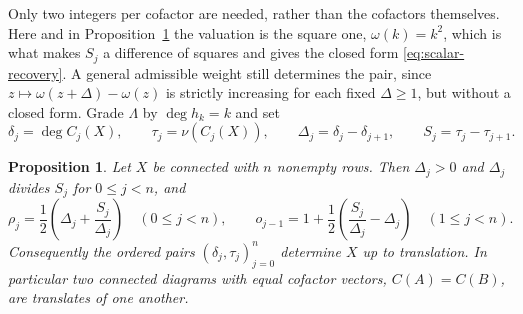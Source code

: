 \documentclass[11pt,a4paper]{amsart}
\numberwithin{equation}{section}
\theoremstyle{plain}
\newtheorem{proposition}[theorem]{Proposition}
\theoremstyle{definition}
\newcommand{\Lam}{\Lambda}
\newcommand{\wt}{\nu}
\begin{document}
Only two integers per cofactor are needed, rather than the cofactors themselves.  Here and in Proposition~\ref{prop:stable-cofactor} the valuation is the square one, \(\omega(k)=k^2\), which is what makes \(S_j\) a difference of squares and gives the closed form \eqref{eq:scalar-recovery}.  A general admissible weight still determines the pair, since \(z\mapsto\omega(z+\Delta)-\omega(z)\) is strictly increasing for each fixed \(\Delta\ge1\), but without a closed form.  Grade \(\Lam\) by \(\deg h_k=k\) and set
\begin{equation}\label{eq:scalar-data}
\delta_j=\deg C_j(X),
\qquad
\tau_j=\wt(C_j(X)),
\qquad
\Delta_j=\delta_j-\delta_{j+1},
\qquad
S_j=\tau_j-\tau_{j+1}.
\end{equation}

\begin{proposition}\label{prop:stable-cofactor}
Let \(X\) be connected with \(n\) nonempty rows.  Then \(\Delta_j>0\) and \(\Delta_j\) divides \(S_j\) for \(0\le j<n\), and
\begin{equation}\label{eq:scalar-recovery}
\rho_j
=
\frac12\left(\Delta_j+\frac{S_j}{\Delta_j}\right)
\quad(0\le j<n),
\qquad
o_{j-1}
=
1+\frac12\left(\frac{S_j}{\Delta_j}-\Delta_j\right)
\quad(1\le j<n).
\end{equation}
Consequently the ordered pairs \((\delta_j,\tau_j)_{j=0}^{n}\) determine \(X\) up to translation.  In particular two connected diagrams with equal cofactor vectors, \(C(A)=C(B)\), are translates of one another.
\end{proposition}
\end{document}
